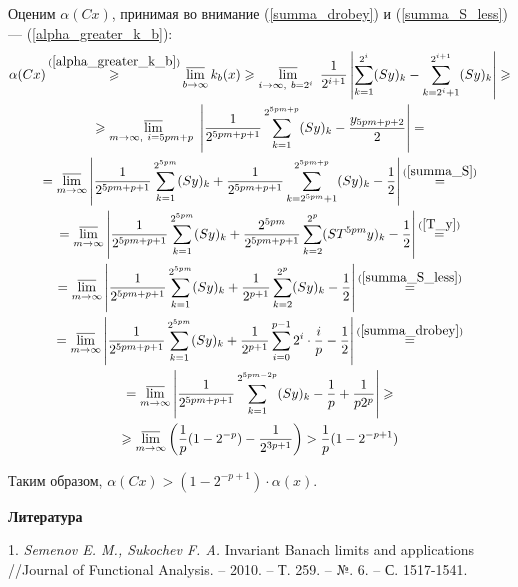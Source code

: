 Оценим $\alpha(Cx)$, принимая во внимание (\ref{summa_drobey}) и (\ref{summa_S_less}) --- (\ref{alpha_greater_k_b}):
\begin{multline*}
	\alpha (Cx) \mathop{\geqslant}^{(\ref{alpha_greater_k_b})}
	\varlimsup_{b\to \infty} k_b(x) \geqslant
	\varlimsup_{
		i\to \infty,~
		b=2^i~
	}\frac{1}{2^{i+1}}\left|
		\sum_{k=1}^{2^i}(Sy)_k - \sum_{k=2^i+1}^{2^{i+1}}(Sy)_k
	\right| \geqslant
	\\ \geqslant
	\varlimsup_{
		m\to \infty,~
		i=5pm+p~
	}\left|
		\frac{1}{2^{5pm+p+1}}\sum_{k=1}^{2^{5pm+p}}(Sy)_k - \frac{y_{5pm+p+2}}{2}
	\right| =
	\\=
	\varlimsup_{m\to \infty}\left|
		\frac{1}{2^{5pm+p+1}}\sum_{k=1}^{2^{5pm}}(Sy)_k
		+
		\frac{1}{2^{5pm+p+1}}\sum_{k=2^{5pm}+1}^{2^{5pm+p}}(Sy)_k
		- \frac{1}{2}
	\right|
	\mathop{=}^{(\ref{summa_S})}
	\\=
	\varlimsup_{m\to \infty}\left|
		\frac{1}{2^{5pm+p+1}}\sum_{k=1}^{2^{5pm}}(Sy)_k
		+
		\frac{2^{5pm}}{2^{5pm+p+1}} \sum_{k=2}^{2^p}(ST^{5pm}y)_k
		- \frac{1}{2}
	\right|
	\mathop{=}^{(\ref{T_y})}
	\\=
	\varlimsup_{m\to \infty}\left|
		\frac{1}{2^{5pm+p+1}}\sum_{k=1}^{2^{5pm}}(Sy)_k
		+
		\frac{1}{2^{p+1}} \sum_{k=2}^{2^p}(Sy)_k
		- \frac{1}{2}
	\right|
	\mathop{=}^{(\ref{summa_S_less})}
	\\=
	\varlimsup_{m\to \infty}\left|
		\frac{1}{2^{5pm+p+1}}\sum_{k=1}^{2^{5pm}}(Sy)_k
		+
		\frac{1}{2^{p+1}} \sum_{i=0}^{p-1}2^i \cdot \frac{i}{p}
		- \frac{1}{2}
	\right|
	\mathop{=}^{(\ref{summa_drobey})}
	\\=
	\varlimsup_{m\to \infty}\left|
		\frac{1}{2^{5pm+p+1}}\sum_{k=1}^{2^{5pm-2p}}(Sy)_k
		-\frac{1}{p} + \frac{1}{p 2^p}
	\right| \geqslant
	\\ \geqslant
	\varlimsup_{m\to \infty} \left(
		\frac{1}{p} (1-2^{-p})
		- \frac{1}{2^{3p+1}}
	\right) >
	\frac{1}{p} (1-2^{-p+1})
\end{multline*}


Таким образом,
$
	\alpha(Cx) >
	(1-2^{-p+1}) \cdot \alpha(x)
$.

\smallskip \centerline{\bf Литература}\nopagebreak

1. {\it Semenov E. M., Sukochev F. A.}
 Invariant Banach limits and applications //Journal of Functional Analysis. – 2010. – Т. 259. – №. 6. – С. 1517-1541.
